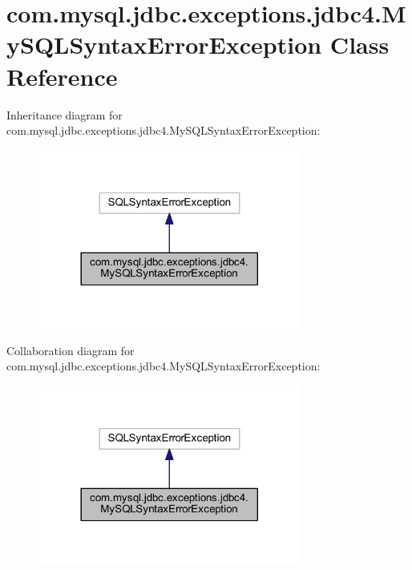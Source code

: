 \hypertarget{classcom_1_1mysql_1_1jdbc_1_1exceptions_1_1jdbc4_1_1_my_s_q_l_syntax_error_exception}{}\section{com.\+mysql.\+jdbc.\+exceptions.\+jdbc4.\+My\+S\+Q\+L\+Syntax\+Error\+Exception Class Reference}
\label{classcom_1_1mysql_1_1jdbc_1_1exceptions_1_1jdbc4_1_1_my_s_q_l_syntax_error_exception}


Inheritance diagram for com.\+mysql.\+jdbc.\+exceptions.\+jdbc4.\+My\+S\+Q\+L\+Syntax\+Error\+Exception\+:
\nopagebreak
\begin{figure}[H]
\begin{center}
\leavevmode
\includegraphics[width=245pt]{classcom_1_1mysql_1_1jdbc_1_1exceptions_1_1jdbc4_1_1_my_s_q_l_syntax_error_exception__inherit__graph}
\end{center}
\end{figure}


Collaboration diagram for com.\+mysql.\+jdbc.\+exceptions.\+jdbc4.\+My\+S\+Q\+L\+Syntax\+Error\+Exception\+:
\nopagebreak
\begin{figure}[H]
\begin{center}
\leavevmode
\includegraphics[width=245pt]{classcom_1_1mysql_1_1jdbc_1_1exceptions_1_1jdbc4_1_1_my_s_q_l_syntax_error_exception__coll__graph}
\end{center}
\end{figure}
